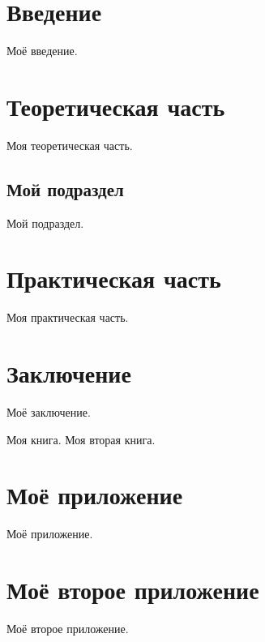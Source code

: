 \documentclass{../mirea-prog-lang}
\begin{document}
	

	

\tableofcontents

\section*{Введение}
{}

Моё введение.



\section{Теоретическая часть}

Моя теоретическая часть.

\subsection{Мой подраздел}

Мой подраздел.



\section{Практическая часть}

Моя практическая часть.



\section*{Заключение}
{}

Моё заключение.



\begin{thebibliography}{99\kern\bibindent}
	 Моя книга.
	 Моя вторая книга. 
\end{thebibliography}



\appendix

\section{Моё приложение}

Моё приложение.

\section{Моё второе приложение}

Моё второе приложение.


	
\end{document}
